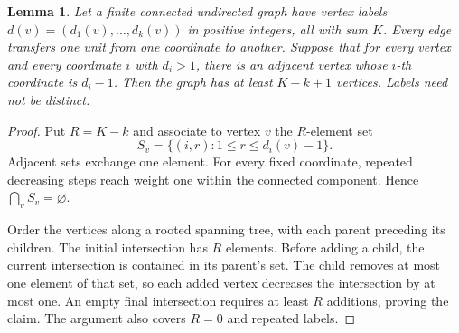 \documentclass[11pt]{article}
\newtheorem{lemma}[theorem]{Lemma}
\begin{document}
\begin{lemma}\label{lem:sets}
Let a finite connected undirected graph have vertex labels
$d(v)=(d_1(v),\ldots,d_k(v))$ in positive integers, all with sum $K$.
Every edge transfers one unit from one coordinate to another. Suppose
that for every vertex and every coordinate $i$ with $d_i>1$, there is
an adjacent vertex whose $i$-th coordinate is $d_i-1$.
Then the graph has at least $K-k+1$ vertices. Labels need not be distinct.
\end{lemma}
\begin{proof}
Put $R=K-k$ and associate to vertex $v$ the $R$-element set
\[
 S_v=\{(i,r):1\le r\le d_i(v)-1\}.
\]
Adjacent sets exchange one element. For every fixed coordinate, repeated
decreasing steps reach weight one within the connected component.
Hence $\bigcap_v S_v=\varnothing$.

Order the vertices along a rooted spanning tree, with each parent
preceding its children. The initial intersection has $R$ elements.
Before adding a child, the current intersection is contained in its
parent's set. The child removes at most one element of that set, so
each added vertex decreases the intersection by at most one. An empty
final intersection requires at least $R$ additions, proving the claim.
The argument also covers $R=0$ and repeated labels.
\end{proof}
\end{document}
